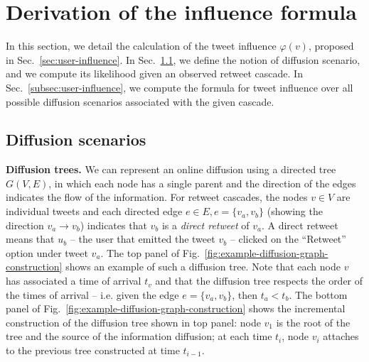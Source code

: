 %

\section{Derivation of the influence formula}
\label{si-sec:infl-derivation}

In this section, we detail the calculation of the tweet influence $\varphi(v)$, proposed in Sec.~\ref{sec:user-influence}.
In Sec.~\ref{subsec:diffusion-scenario}, we define the notion of diffusion scenario, and we compute its likelihood given an observed retweet cascade.
In Sec.~\ref{subsec:user-influence}, we compute the formula for tweet influence over all possible diffusion scenarios associated with the given cascade.

\subsection{Diffusion scenarios}
\label{subsec:diffusion-scenario}

\textbf{Diffusion trees.}
We can represent an online diffusion using a directed tree $G(V, E)$, in which each node has a single parent and the direction of the edges indicates the flow of the information.
For retweet cascades, the nodes $v \in V$ are individual tweets and each directed edge $e \in E, e = \{v_a, v_b\}$ (showing the direction $v_a \longrightarrow v_b$) indicates that $v_b$ is a \emph{direct retweet} of $v_a$.
A direct retweet means that $u_b$ -- the user that emitted the tweet $v_b$ -- clicked on the ``Retweet'' option under tweet $v_a$.
The top panel of Fig.~\ref{fig:example-diffusion-graph-construction} shows an example of such a diffusion tree.
Note that each node $v$ has associated a time of arrival $t_v$ and that the diffusion tree respects the order of the times of arrival -- i.e. given the edge $e = \{v_a, v_b\}$, then $t_a < t_b$.
The bottom panel of Fig.~\ref{fig:example-diffusion-graph-construction} shows the incremental construction of the diffusion tree shown in top panel:
node $v_1$ is the root of the tree and the source of the information diffusion; 
at each time $t_i$, node $v_i$ attaches to the previous tree constructed at time $t_{i-1}$.


